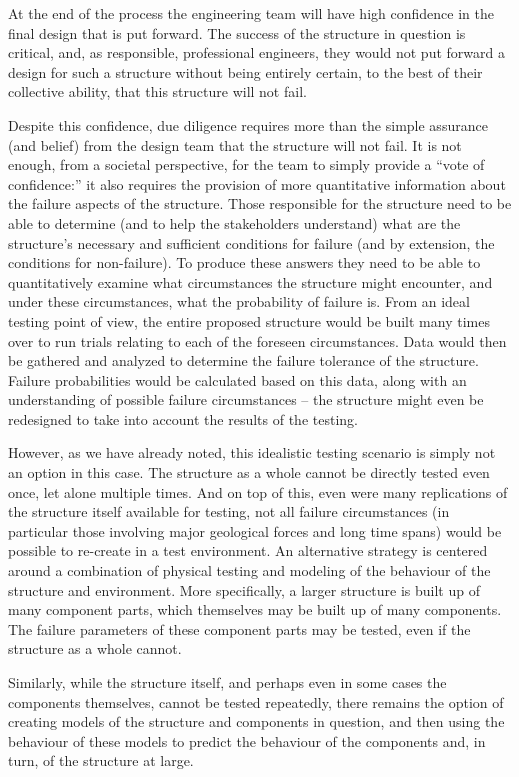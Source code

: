 \par
At the end of the process the engineering team will have high confidence in the final design that is put forward. The success of the structure in question is critical, and, as responsible, professional engineers, they would not put forward a design for such a structure without being entirely certain, to the best of their collective ability, that this structure will not fail.
\par
Despite this confidence, due diligence requires more than the simple assurance (and belief) from the design team that the structure will not fail. It is not enough, from a societal perspective, for the team to simply provide a ``vote of confidence:'' it also requires the provision of more quantitative information about the failure aspects of the structure. Those responsible for the structure need to be able to determine (and to help the stakeholders understand) what are the structure's necessary and sufficient conditions for failure (and by extension, the conditions for non-failure). To produce these answers they need to be able to quantitatively examine what circumstances the structure might encounter, and under these circumstances, what the probability of failure is.
\newl
From an ideal testing point of view, the entire proposed structure would be built many times over to run trials relating to each of the foreseen circumstances. Data would then be gathered and analyzed to determine the failure tolerance of the structure. Failure probabilities would be calculated based on this data, along with an understanding of possible failure circumstances -- the structure might even be redesigned to take into account the results of the testing. 
\par
However, as we have already noted, this idealistic testing scenario is simply not an option in this case. The structure as a whole cannot be directly tested even once, let alone multiple times. And on top of this, even were many replications of the structure itself available for testing, not all failure circumstances (in particular those involving major geological forces and long time spans) would be possible to re-create in a test environment.
\newl
An alternative strategy is centered around a combination of physical testing and modeling of the behaviour of the structure and environment. More specifically, a larger structure is built up of many component parts, which themselves may be built up of many components. The failure parameters of these component parts may be tested, even if the structure as a whole cannot. \par Similarly, while the structure itself, and perhaps even in some cases the components themselves, cannot be tested repeatedly, there remains the option of creating models of the structure and components in question, and then using the behaviour of these models to predict the behaviour of the components and, in turn, of the structure at large.
